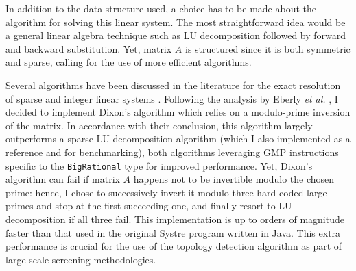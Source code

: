 \documentclass[main.tex]{subfiles}
\begin{document}
In addition to the data structure used, a choice has to be made about the algorithm for solving this linear system. The most straightforward idea would be a general linear algebra technique such as LU decomposition followed by forward and backward substitution. Yet, matrix $A$ is structured since it is both symmetric and sparse, calling for the use of more efficient algorithms. %


Several algorithms have been discussed in the literature for the exact resolution of sparse and integer linear systems \autocite{sparseLinearRational,blackbox,Dixon,Wiedemann}. Following the analysis by Eberly \textit{et al.} \autocite{sparseLinearRational}, I decided to implement Dixon's algorithm \autocite{Dixon} which relies on a modulo-prime inversion of the matrix. In accordance with their conclusion, this algorithm largely outperforms a sparse LU decomposition algorithm (which I also implemented as a reference and for benchmarking), both algorithms leveraging GMP instructions specific to the \texttt{BigRational} type for improved performance. Yet, Dixon's algorithm can fail if matrix $A$ happens not to be invertible modulo the chosen prime: hence, I chose to successively invert it modulo three hard-coded large primes and stop at the first succeeding one, and finally resort to LU decomposition if all three fail.
This implementation is up to orders of magnitude faster than that used in the original Systre program written in Java. This extra performance is crucial for the use of the topology detection algorithm as part of large-scale screening methodologies.

\end{document}
